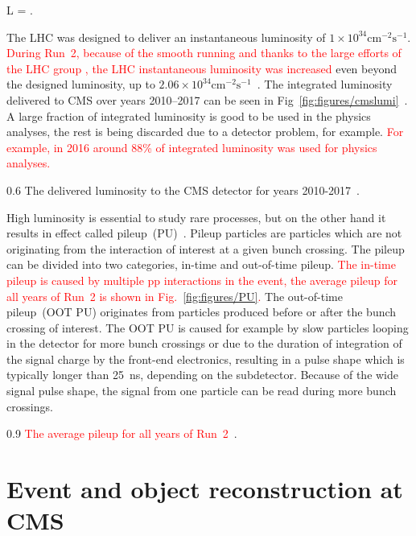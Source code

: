 {
 L = .
}

The LHC was designed to deliver an instantaneous luminosity of $1 \times 10^{34} \mathrm{cm^{-2}s^{-1}}$.  \textcolor{red}{During Run~2, because of the smooth running and thanks to the large efforts of the LHC group , the LHC instantaneous luminosity was increased}  even beyond the designed luminosity, up to $2.06 \times 10^{34} \mathrm{cm^{-2}s^{-1}}$~\cite{website:CMSlumi}. The integrated luminosity delivered to CMS over years 2010--2017 can be seen in Fig~\ref{fig:figures/cmslumi}~\cite{website:CMSlumi}. A large fraction of integrated luminosity is good to be used in the physics analyses, the rest is being discarded due to a detector problem, for example. \textcolor{red}{For example, in 2016 around 88\% of integrated luminosity was used for physics analyses.} 


                 {0.6}       %
                 { The delivered luminosity to the CMS detector for years 2010-2017~\cite{website:CMSlumi}. }


High luminosity is essential to study rare processes, but on the other hand it results in effect called pileup~(PU)~\cite{Bayatian:2006nff}. Pileup particles are particles which are not originating from the interaction of interest at a given bunch crossing. The pileup can be divided into two categories, in-time and out-of-time pileup. \textcolor{red}{The in-time pileup is caused by multiple pp interactions in the event, the average pileup for all years of Run~2 is shown in Fig.~\ref{fig:figures/PU}.}  The out-of-time pileup~(OOT PU) originates from particles produced before or after the bunch crossing of interest. The OOT PU is caused for example by slow particles looping in the detector for more bunch crossings or due to the duration of integration of the signal charge by the front-end electronics, resulting in a pulse shape which is typically longer than 25~ns, depending on the subdetector. Because of the wide signal pulse shape, the signal from one particle can be read during more bunch crossings.

                 {0.9}       %
                 { \textcolor{red}{The average pileup for all years of Run~2~\cite{website:CMSlumi}}. }

\section{Event and object reconstruction at CMS~\label{sec:objects}}

